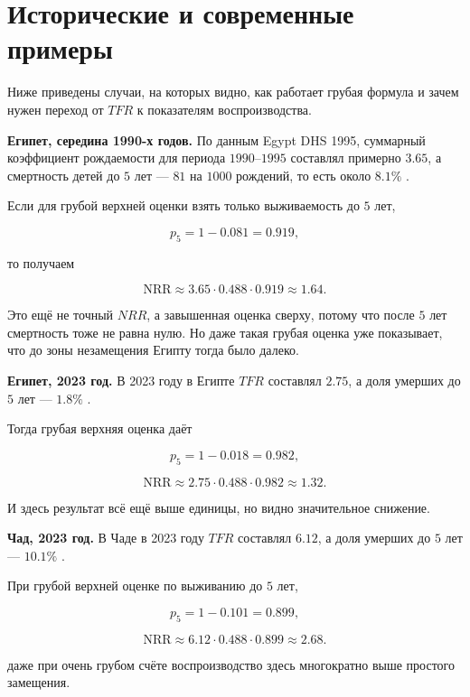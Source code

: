 \documentclass[a4paper, 14pt]{extarticle}
\begin{document}
\section{Исторические и современные примеры}

Ниже приведены случаи, на которых видно, как работает грубая формула и зачем нужен переход от $TFR$ к показателям воспроизводства.

\textbf{Египет, середина 1990-х годов.}
По данным Egypt DHS 1995, суммарный коэффициент рождаемости для периода $1990$--$1995$ составлял примерно $3.65$, а смертность детей до $5$ лет --- $81$ на $1000$ рождений, то есть около $8.1\%$ \cite{egypt_rand, egypt_dhs1995_child}.

Если для грубой верхней оценки взять только выживаемость до $5$ лет,

\[
p_5 = 1-0.081 = 0.919,
\]

то получаем

\[
\text{NRR} \approx 3.65 \cdot 0.488 \cdot 0.919 \approx 1.64.
\]

Это ещё не точный $NRR$, а завышенная оценка сверху, потому что после $5$ лет смертность тоже не равна нулю. Но даже такая грубая оценка уже показывает, что до зоны незамещения Египту тогда было далеко.

\vspace{0.4cm}

\textbf{Египет, 2023 год.}
В 2023 году в Египте $TFR$ составлял $2.75$, а доля умерших до $5$ лет --- $1.8\%$ \cite{egypt_profile}.

Тогда грубая верхняя оценка даёт

\[
p_5 = 1-0.018 = 0.982,
\]

\[
\text{NRR} \approx 2.75 \cdot 0.488 \cdot 0.982 \approx 1.32.
\]

И здесь результат всё ещё выше единицы, но видно значительное снижение.

\vspace{0.4cm}

\textbf{Чад, 2023 год.}
В Чаде в 2023 году $TFR$ составлял $6.12$, а доля умерших до $5$ лет --- $10.1\%$ \cite{chad_profile}.

При грубой верхней оценке по выживанию до $5$ лет,

\[
p_5 = 1-0.101 = 0.899,
\]

\[
\text{NRR} \approx 6.12 \cdot 0.488 \cdot 0.899 \approx 2.68.
\]

даже при очень грубом счёте воспроизводство здесь многократно выше простого замещения.
\end{document}
